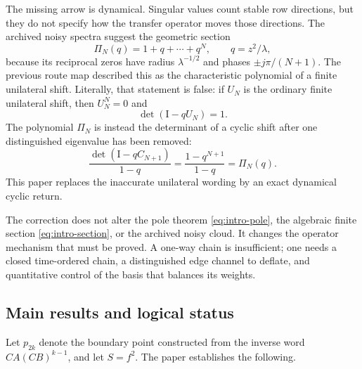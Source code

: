 \documentclass[11pt]{article}
\theoremstyle{definition}
\theoremstyle{remark}
\newcommand{\Id}{\mathrm I}
\begin{document}
The missing arrow is dynamical.  Singular values count stable row directions,
but they do not specify how the transfer operator moves those directions.
The archived noisy spectra suggest the geometric section
\begin{equation}\label{eq:intro-section}
 \Pi_N(q)=1+q+\cdots+q^N,
 \qquad q=z^2/\lambda,
\end{equation}
because its reciprocal zeros have radius $\lambda^{-1/2}$ and phases
$\pm j\pi/(N+1)$.  The previous route map described this as the
characteristic polynomial of a finite unilateral shift.  Literally, that
statement is false: if $U_N$ is the ordinary finite unilateral shift, then
$U_N^N=0$ and
\begin{equation}\label{eq:nilpotent-warning}
 \det(\Id-qU_N)=1.
\end{equation}
The polynomial $\Pi_N$ is instead the determinant of a cyclic shift after
one distinguished eigenvalue has been removed:
\begin{equation}\label{eq:cyclic-preview}
 \frac{\det(\Id-qC_{N+1})}{1-q}
 =\frac{1-q^{N+1}}{1-q}=\Pi_N(q).
\end{equation}
This paper replaces the inaccurate unilateral wording by an exact dynamical
cyclic return.

The correction does not alter the pole theorem
\eqref{eq:intro-pole}, the algebraic finite section
\eqref{eq:intro-section}, or the archived noisy cloud.  It changes the
operator mechanism that must be proved.  A one-way chain is insufficient;
one needs a closed time-ordered chain, a distinguished edge channel to
deflate, and quantitative control of the basis that balances its weights.

\subsection*{Main results and logical status}

Let $p_{2k}$ denote the boundary point constructed from the inverse word
$CA(CB)^{k-1}$, and let $S=f^2$.  The paper establishes the following.
\end{document}
